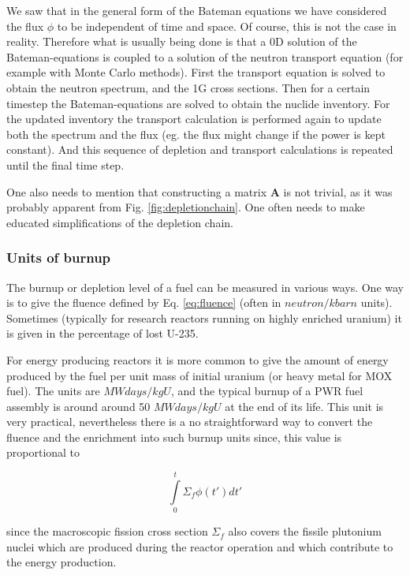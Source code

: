We saw that in the general form of the Bateman equations we have considered the flux $\phi$ to be independent of time and space. Of course, this is not the case in reality. Therefore what is usually being done is that a 0D solution of the Bateman-equations is coupled to a solution of the neutron transport equation (for example with Monte Carlo methods). First the transport equation is solved to obtain the neutron spectrum, and the 1G cross sections. Then for a certain timestep the Bateman-equations are solved to obtain the nuclide inventory. For the updated inventory the transport calculation is performed again to update both the spectrum and the flux (eg. the flux might change if the power is kept constant). And this sequence of depletion and transport calculations is repeated until the final time step. 

One also needs to mention that constructing a matrix $\mathbf{A}$ is not trivial, as it was probably apparent from Fig. \ref{fig:depletionchain}. One often needs to make educated simplifications of the depletion chain. 

\subsubsection*{Units of burnup}

The burnup or depletion level of a fuel can be measured in various ways. One way is to give the fluence defined by Eq. \eqref{eq:fluence} (often in $neutron/kbarn$ units). Sometimes (typically for research reactors running on highly enriched uranium) it is given in the percentage of lost U-235. 

For energy producing reactors it is more common to give the amount of energy produced by the fuel per unit mass of initial uranium (or heavy metal for MOX fuel). The units are $MWdays/kgU$, and the typical burnup of a PWR fuel assembly is around around 50 $MWdays/kgU$ at the end of its life. This unit is very practical, nevertheless there is a no straightforward way to convert the fluence and the enrichment into such burnup units since, this value is proportional to 

\[
\int\limits_0^t \Sigma_f \phi(t')dt'
\]

\noindent since the macroscopic fission cross section $\Sigma_f$ also covers the fissile plutonium nuclei which are produced during the reactor operation and which contribute to the energy production. 


